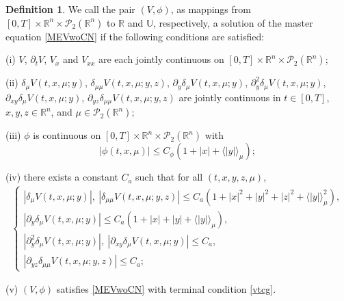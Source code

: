 \documentclass{amsart}
\theoremstyle{definition}
\newtheorem{definition}[theorem]{Definition}
\theoremstyle{remark}
\numberwithin{equation}{section}
\begin{document}
\begin{definition}\label{def:vsol}
We call the pair $(V, \phi)$, as mappings from $[0,T]\times \mathbb{R}^n\times {\mathcal P}_2(\mathbb{R}^n) $ to $\mathbb{R}$ and $\mathbb{U}$, respectively,  a solution of the master equation \eqref{MEVwoCN} if the following conditions are satisfied:

(i) $V$, $\partial_tV$, $V_{x}$ and $V_{xx}$ are each jointly continuous  on
 $[0,T]\times \mathbb{R}^n \times {\mathcal P}_2 (\mathbb{R}^n )$;

(ii)
$\delta_\mu V(t,x,\mu; y)$, $\delta_{\mu\mu} V(t, x, \mu; y,z)$, $\partial_y\delta_\mu V(t,x,\mu; y)$, $\partial_y^2\delta_\mu V(t,x,\mu; y)$, $\partial_{xy}\delta_\mu V(t,x,\mu; y)$, $\partial_{yz}\delta_{\mu\mu} V(t, x, \mu; y,z)$ are    jointly continuous in $t\in [0,T]$, $x,y,z\in \mathbb{R}^n$, and
 $\mu \in   {\mathcal P}_2(\mathbb{R}^n)  $;

(iii) $\phi$ is continuous on $[0,T] \times \mathbb{R}^n\times {\mathcal P}_2(\mathbb{R}^n)$ with
 $$
 |\phi(t, x, \mu)|\le C_\phi (1+|x|+\langle |y| \rangle_{\mu});
 $$

(iv) there exists a constant $C_a$  such that for all $(t, x, y,z, \mu)$,
\begin{align}
\begin{cases}
|\delta_\mu V(t,x,\mu;y)|, \ |\delta_{\mu\mu} V(t,x,\mu; y,z)|\le C_a (1+|x|^2+|y|^2  +|z|^2+\langle |y|\rangle_{\mu}^2 ) , \\
 |\partial_y\delta_\mu V(t,x,\mu;y)|\le C_a(1+|x|+|y|+  \langle |y| \rangle_{\mu} ),\\
|\partial_{y}^2 \delta_\mu V(t,x,\mu; y)|,\ | \partial_{xy}\delta_\mu V(t,x, \mu;y)|\le C_a , \\
 |\partial_{yz}\delta_{\mu\mu} V (t, x, \mu; y,z)|\le C_a;
\end{cases} \label{vgc1}
\end{align}

(v) $(V,\phi)$ satisfies \eqref{MEVwoCN} with terminal condition \eqref{vtcg}.
\end{definition}
\end{document}
